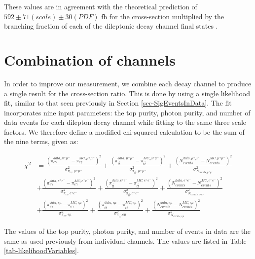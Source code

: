 These values are in agreement with the theoretical prediction of $592 \pm 71 (scale) \pm 30 (PDF)$ fb for the cross-section multiplied by the branching fraction of each of the dileptonic decay channel final states \cite{QCDcorrttgamma}.

\section{Combination of channels} \label{sec-CombinationOfChannels}

In order to improve our measurement, we combine each decay channel to produce a single result for the cross-section ratio. This is done by using a single likelihood fit, similar to that seen previously in Section \ref{sec-SigEventsInData}. The fit incorporates nine input parameters: the top purity, photon purity, and number of data events for each dilepton decay channel while fitting to the same three scale factors. We therefore define a modified chi-squared calculation to be the sum of the nine terms, given as:

\begin{equation}
\begin{split}
\chi^2 & = \frac{\left(\pi^{data,\mu^+\mu^-}_{e\gamma} - \pi^{MC,\mu^+\mu^-}_{e\gamma}\right)^2}{\sigma^2_{\pi_{e\gamma},\mu^+\mu^-}} + \frac{\left(\pi^{data,\mu^+\mu^-}_{t\bar{t}} - \pi^{MC,\mu^+\mu^-}_{t\bar{t}}\right)^2}{\sigma^2_{\pi_{t\bar{t}},\mu^+\mu^-}} + \frac{\left(N^{data,\mu^+\mu^-}_{events} - N^{MC,\mu^+\mu^-}_{events}\right)^2}{\sigma^2_{N_{events,\mu^+\mu^-}}} \\
& + \frac{\left(\pi^{data,e^+e^-}_{e\gamma} - \pi^{MC,e^+e^-}_{e\gamma}\right)^2}{\sigma^2_{\pi_{e\gamma},e^+e^-}} + \frac{\left(\pi^{data,e^+e^-}_{t\bar{t}} - \pi^{MC,e^+e^-}_{t\bar{t}}\right)^2}{\sigma^2_{\pi_{t\bar{t}},e^+e^-}} + \frac{\left(N^{data,e^+e^-}_{events} - N^{MC,e^+e^-}_{events}\right)^2}{\sigma^2_{N_{events,e^+e^-}}} \\
& + \frac{\left(\pi^{data,e\mu}_{e\gamma} - \pi^{MC,e\mu}_{e\gamma}\right)^2}{\sigma^2_{\pi_{e\gamma},e\mu}} + \frac{\left(\pi^{data,e\mu}_{t\bar{t}} - \pi^{MC,e\mu}_{t\bar{t}}\right)^2}{\sigma^2_{\pi_{t\bar{t}},e\mu}} + \frac{\left(N^{data,e\mu}_{events} - N^{MC,e\mu}_{events}\right)^2}{\sigma^2_{N_{events,e\mu}}} 
\end{split}
\end{equation}

The values of the top purity, photon purity, and number of events in data are the same as used previously from individual channels. The values are listed in Table \ref{tab-likelihoodVariables}.  


